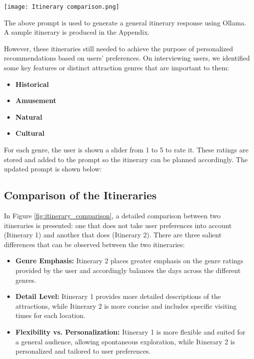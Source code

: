 \documentclass[sigconf,authordraft]{acmart}
\begin{document}
\begin{figure*}[h!]
    \centering
    \texttt{[image: Itinerary comparison.png]}
    \caption{Comparison of Itineraries With and Without User Preferences Included}
    \label{fig:itinerary_comparison}
\end{figure*}

The above prompt is used to generate a general itinerary response using Ollama. A sample itinerary is produced in the Appendix.

However, these itineraries still needed to achieve the purpose of personalized recommendations based on users' preferences. On interviewing users, we identified some key features or distinct attraction genres that are important to them:

\begin{itemize}[noitemsep, topsep=5pt, parsep=0pt, partopsep=0pt]
    \item \textbf{Historical}
    \item \textbf{Amusement}
    \item \textbf{Natural}
    \item \textbf{Cultural}
\end{itemize}

For each genre, the user is shown a slider from 1 to 5 to rate it. These ratings are stored and added to the prompt so the itinerary can be planned accordingly. The updated prompt is shown below:

\subsection{Comparison of the Itineraries}

In Figure \ref{fig:itinerary_comparison}, a detailed comparison between two itineraries is presented: one that does not take user preferences into account (Itinerary 1) and another that does (Itinerary 2). There are three salient differences that can be observed between the two itineraries:

\begin{itemize}[noitemsep, topsep=5pt, parsep=0pt, partopsep=0pt]
\item \textbf{Genre Emphasis:} Itinerary 2 places greater emphasis on the genre ratings provided by the user and accordingly balances the days across the different genres.

\item \textbf{Detail Level:} Itinerary 1 provides more detailed descriptions of the attractions, while Itinerary 2 is more concise and includes specific visiting times for each location.

\item \textbf{Flexibility vs. Personalization:} Itinerary 1 is more flexible and suited for a general audience, allowing spontaneous exploration, while Itinerary 2 is personalized and tailored to user preferences.
\end{itemize}
\end{document}
